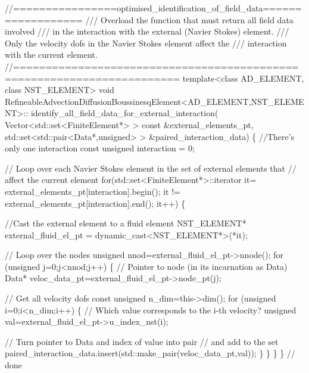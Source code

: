  
\begin{DoxyCodeInclude}
\textcolor{comment}{//================optimised\_identification\_of\_field\_data==================}
\textcolor{comment}{/// Overload the function that must return all field data involved}
\textcolor{comment}{}\textcolor{comment}{/// in the interaction with the external (Navier Stokes) element. }
\textcolor{comment}{}\textcolor{comment}{/// Only the velocity dofs in the Navier Stokes element affect the}
\textcolor{comment}{}\textcolor{comment}{/// interaction with the current element. }
\textcolor{comment}{}\textcolor{comment}{//=======================================================================}
\textcolor{keyword}{template}<\textcolor{keyword}{class} AD\_ELEMENT, \textcolor{keyword}{class} NST\_ELEMENT>
\textcolor{keywordtype}{void} RefineableAdvectionDiffusionBoussinesqElement<AD\_ELEMENT,NST\_ELEMENT>::
identify\_all\_field\_data\_for\_external\_interaction(
 Vector<std::set<FiniteElement*> > \textcolor{keyword}{const} &external\_elements\_pt,
 std::set<std::pair<Data*,unsigned> > &paired\_interaction\_data)
 \{
  \textcolor{comment}{//There's only one interaction}
  \textcolor{keyword}{const} \textcolor{keywordtype}{unsigned} interaction = 0;
  
  \textcolor{comment}{// Loop over each Navier Stokes element in the set of external elements that}
  \textcolor{comment}{// affect the current element}
  \textcolor{keywordflow}{for}(std::set<FiniteElement*>::iterator it=
       external\_elements\_pt[interaction].begin();
      it != external\_elements\_pt[interaction].end(); it++)
   \{
    
    \textcolor{comment}{//Cast the external element to a fluid element}
    NST\_ELEMENT* external\_fluid\_el\_pt =
     \textcolor{keyword}{dynamic\_cast<}NST\_ELEMENT*\textcolor{keyword}{>}(*it);
   
   \textcolor{comment}{// Loop over the nodes}
   \textcolor{keywordtype}{unsigned} nnod=external\_fluid\_el\_pt->nnode();
   \textcolor{keywordflow}{for} (\textcolor{keywordtype}{unsigned} j=0;j<nnod;j++)
    \{
     \textcolor{comment}{// Pointer to node (in its incarnation as Data)}
     Data* veloc\_data\_pt=external\_fluid\_el\_pt->node\_pt(j);
     
     \textcolor{comment}{// Get all velocity dofs}
     \textcolor{keyword}{const} \textcolor{keywordtype}{unsigned} n\_dim=this->dim();
     \textcolor{keywordflow}{for} (\textcolor{keywordtype}{unsigned} i=0;i<n\_dim;i++)
      \{
       \textcolor{comment}{// Which value corresponds to the i-th velocity?}
       \textcolor{keywordtype}{unsigned} val=external\_fluid\_el\_pt->u\_index\_nst(i);
       
       \textcolor{comment}{// Turn pointer to Data and index of value into pair}
       \textcolor{comment}{// and add to the set}
       paired\_interaction\_data.insert(std::make\_pair(veloc\_data\_pt,val));
      \}
    \}
  \}
\} \textcolor{comment}{// done}

\end{DoxyCodeInclude}


